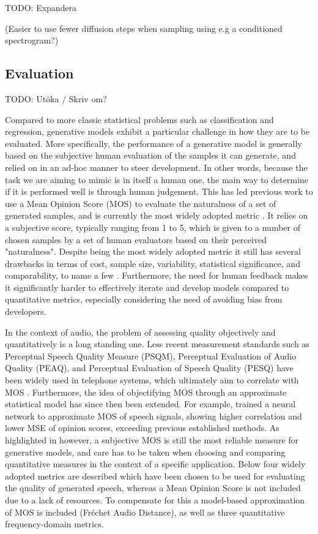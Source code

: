 \documentclass{article}
\begin{document}
TODO: Expandera

(Easier to use fewer diffusion steps when sampling using e.g a conditioned spectrogram?)


\subsection{Evaluation} \label{sec:eval}

TODO: Utöka / Skriv om?

Compared to more classic statistical problems such as classification and regression, generative models exhibit a particular challenge in how they are to be evaluated. More specifically, the performance of a generative model is generally based on the subjective human evaluation of the samples it can generate, and relied on in an ad-hoc manner to steer development. In other words, because the task we are aiming to mimic is in itself a human one, the main way to determine if it is performed well is through human judgement. This has led previous work to use a Mean Opinion Score (MOS) to evaluate the naturalness of a set of generated samples, and is currently the most widely adopted metric \cite{oord2016wavenet, kong2020diffwave, wang2017tacotron}. It relies on a subjective score, typically ranging from 1 to 5, which is given to a number of chosen samples by a set of human evaluators based on their perceived "naturalness". Despite being the most widely adopted metric it still has several drawbacks in terms of cost, sample size, variability, statistical significance, and comparability, to name a few \cite{streijl2016mean}. Furthermore, the need for human feedback makes it significantly harder to effectively iterate and develop models compared to quantitative metrics, especially considering the need of avoiding bias from developers.

In the context of audio, the problem of assessing quality objectively and quantitatively is a long standing one. Less recent measurement standards such as Perceptual Speech Quality Measure (PSQM), Perceptual Evaluation of Audio Quality (PEAQ), and Perceptual Evaluation of Speech Quality (PESQ) have been widely used in telephone systems, which ultimately aim to correlate with MOS \cite{rix2001perceptual}. Furthermore, the idea of objectifying MOS through an approximate statistical model has since then been extended. For example, \cite{avila2019non} trained a neural network to approximate MOS of speech signals, showing higher correlation and lower MSE of opinion scores, exceeding previous established methods. As highlighted in \cite{theis2015note} however, a subjective MOS is still the most reliable measure for generative models, and care has to be taken when choosing and comparing quantitative measures in the context of a specific application. Below four widely adopted metrics are described which have been chosen to be used for evaluating the quality of generated speech, whereas a Mean Opinion Score is not included due to a lack of resources. To compensate for this a model-based approximation of MOS is included (Fréchet Audio Distance), as well as three quantitative frequency-domain metrics.
\end{document}
